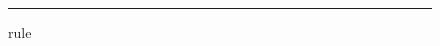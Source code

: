 \documentclass{article}
\begin{document}
\begin{figure}[t]\hrule height 1in\caption{rule}\end{figure}
\lipsum[1]\marginpar{\lipsum[1]}
\lipsum[2]\marginpar{\lipsum[2]}
\lipsum[3-4]
\end{document}
